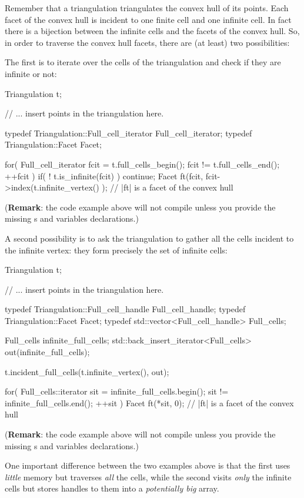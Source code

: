 Remember that a triangulation triangulates the convex hull of its points. Each
facet of the convex hull is incident to one finite cell and one infinite
cell. In fact there is a bijection between the infinite cells and the
facets of the convex hull. So, in order to traverse the convex hull facets,
there are (at least) two possibilities:

The first is to iterate over the cells of the triangulation and check if they
are infinite or not:

\begin{ccExampleCode}
Triangulation t;

// ... insert points in the triangulation here.

typedef Triangulation::Full_cell_iterator Full_cell_iterator;
typedef Triangulation::Facet Facet;

for( Full_cell_iterator fcit = t.full_cells_begin(); fcit != t.full_cells_end(); ++fcit )
{
    if( ! t.is_infinite(fcit) )
        continue;
    Facet ft(fcit, fcit->index(t.infinite_vertex() ); // |ft| is a facet of the convex hull
}
\end{ccExampleCode}
(\textbf{Remark}: the code example above will not compile unless you provide
the missing s and variables declarations.)

A second possibility is to ask the triangulation to gather all the cells
incident to the infinite vertex: they form precisely the set of infinite
cells:

\begin{ccExampleCode}
Triangulation t;

// ... insert points in the triangulation here.

typedef Triangulation::Full_cell_handle Full_cell_handle;
typedef Triangulation::Facet Facet;
typedef std::vector<Full_cell_handle> Full_cells;

Full_cells infinite_full_cells;
std::back_insert_iterator<Full_cells> out(infinite_full_cells);

t.incident_full_cells(t.infinite_vertex(), out);

for( Full_cells::iterator sit = infinite_full_cells.begin(); sit != infinite_full_cells.end(); ++sit )
{
    Facet ft(*sit, 0); // |ft| is a facet of the convex hull
}
\end{ccExampleCode}
(\textbf{Remark}: the code example above will not compile unless you provide
the missing s and variables declarations.)

One important difference between the two examples above is that the first uses
\emph{little} memory but traverses \emph{all} the cells, while the second
visits \emph{only} the infinite cells but stores handles to them into a
\emph{potentially big} array.

